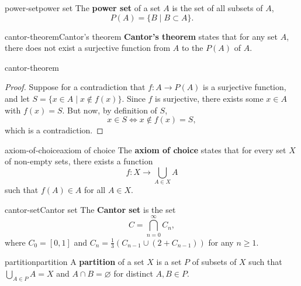 \begin{topic}{power-set}{power set}
    The \textbf{power set} of a set $A$ is the set of all subsets of $A$,
    \[ P(A) = \{ B \mid B \subset A \} . \]
\end{topic}

\begin{topic}{cantor-theorem}{Cantor's theorem}
    \textbf{Cantor's theorem} states that for any set $A$, there does not exist a surjective function from $A$ to the  $P(A)$ of $A$.
\end{topic}

\begin{example}{cantor-theorem}
    \begin{proof}
        Suppose for a contradiction that $f \colon A \to P(A)$ is a surjective function, and let $S = \{ x \in A \mid x \not\in f(x) \}$. Since $f$ is surjective, there exists some $x \in A$ with $f(x) = S$. But now, by definition of $S$,
        \[ x \in S \iff x \not\in f(x) = S , \]
        which is a contradiction.
    \end{proof}
\end{example}

\begin{topic}{axiom-of-choice}{axiom of choice}
    The \textbf{axiom of choice} states that for every set $X$ of non-empty sets, there exists a function
    \[ f \colon X \to \bigcup_{A \in X} A \]
    such that $f(A) \in A$ for all $A \in X$.
\end{topic}

\begin{topic}{cantor-set}{Cantor set}
    The \textbf{Cantor set} is the set
    \[ C = \bigcap_{n = 0}^{\infty} C_n , \]
    where $C_0 = [0, 1]$ and $C_n = \frac{1}{3} \left( C_{n - 1} \cup (2 + C_{n - 1}) \right)$ for any $n \ge 1$.
\end{topic}

\begin{topic}{partition}{partition}
    A \textbf{partition} of a set $X$ is a set $P$ of subsets of $X$ such that $\bigcup_{A \in P} A = X$ and $A \cap B = \varnothing$ for distinct $A, B \in P$.
\end{topic}
